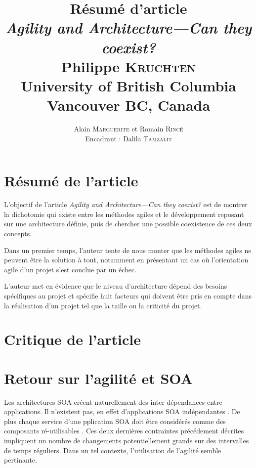\documentclass[12pt,a4paper,utf8x]{article}
\title{{\large \textbf{Résumé d'article}\\\emph{Agility and Architecture—Can they coexist?}\\\vspace{1ex}
 {\scriptsize Philippe \textsc{Kruchten}\\\vspace{0.5ex}University of British Columbia\\\vspace{-4ex}
Vancouver BC, Canada}}}
\author{\small Alain \textsc{Marguerite} et Romain \textsc{Rincé}\\{\small Encadrant : Dalila \textsc{Tamzalit}}}
\date{}
\begin{document}
\maketitle
\renewcommand{\labelitemi}{$\bullet$} 


\section{Résumé de l'article}
L'objectif de l'article \emph{Agility and Architecture—Can they coexist?} est de montrer la dichotomie qui existe entre les méthodes agiles et le développement reposant sur une architecture définie, puis de chercher une possible coexistence de ces deux concepts. 

Dans un premier temps, l'auteur tente de nous monter que les méthodes agiles ne peuvent être la solution à tout, notamment en présentant un cas où l'orientation agile d'un projet s'est conclue par un échec. 

L'auteur met en évidence que le \og niveau\fg{} d'architecture dépend des besoins spécifiques au projet et spécifie huit facteurs qui doivent être pris en compte dans la réalisation d'un projet tel que la taille ou la criticité du projet.

\section{Critique de l'article}


\section{Retour sur l'agilité et SOA }
Les architectures SOA créent naturellement des inter dépendances entre applications. Il n'existent pas, en effet d'applications SOA \og{} indépendantes \fg{}. De plus chaque service d'une pplication SOA doit être considérés comme des composants \og ré-utilisables \of{}. Ces deux dernières contraintes précédement décrites impliquent un nombre de changements potentiellement grands sur des intervalles de temps réguliers. Dans un tel contexte, l'utilisation de l'agilité semble pertinante. 



% 
%
% 
% 
% 


% 
% 
% 
\end{document}
